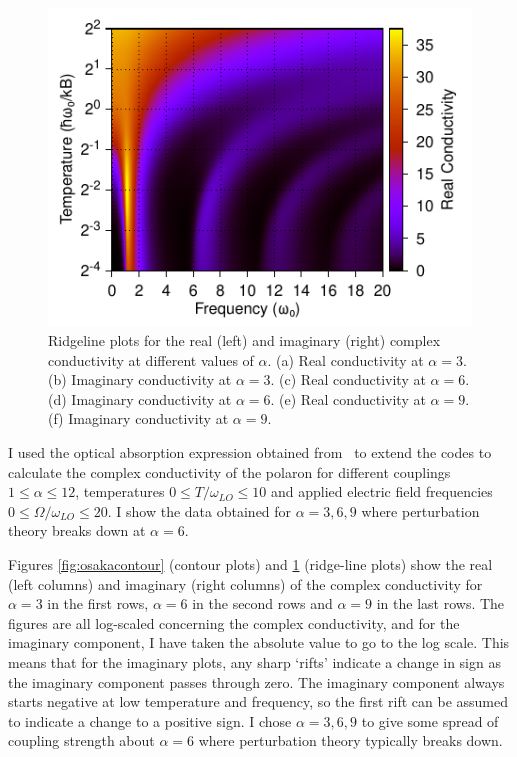 \begin{figure}[t]
    \includegraphics[width=.49\textwidth]{figures/frohlich-3d-imag-memory-alpha-6-temp-00625to32-freq-0to30-contourf-COLOUR.pdf}

    \caption{Ridgeline plots for the real (left) and imaginary (right) complex conductivity at different values of $\alpha$. (a) Real conductivity at $\alpha = 3$. (b) Imaginary conductivity at $\alpha = 3$. (c) Real conductivity at $\alpha = 6$. (d) Imaginary conductivity at $\alpha = 6$. (e) Real conductivity at $\alpha = 9$. (f) Imaginary conductivity at $\alpha = 9$.}
    \label{fig:osakaridge}
\end{figure}

I used the optical absorption expression obtained from~\cite{devreese_optical_1972} to extend the codes to calculate the complex conductivity of the polaron for different couplings $1 \leq \alpha \leq 12$, temperatures $0 \leq T / \omega_{LO} \leq 10$ and applied electric field frequencies $0 \leq \Omega / \omega_{LO} \leq 20$. I show the data obtained for $\alpha = 3, 6, 9$ where perturbation theory breaks down at $\alpha = 6$. 

Figures \ref{fig:osakacontour} (contour plots) and \ref{fig:osakaridge} (ridge-line plots) show the real (left columns) and imaginary (right columns) of the complex conductivity for $\alpha = 3$ in the first rows, $\alpha = 6$ in the second rows and $\alpha = 9$ in the last rows. The figures are all log-scaled concerning the complex conductivity, and for the imaginary component, I have taken the absolute value to go to the log scale. This means that for the imaginary plots, any sharp `rifts' indicate a change in sign as the imaginary component passes through zero. The imaginary component always starts negative at low temperature and frequency, so the first rift can be assumed to indicate a change to a positive sign. I chose $\alpha = 3, 6, 9$ to give some spread of coupling strength about $\alpha = 6$ where perturbation theory typically breaks down. 

